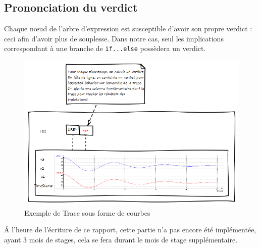 	\subsection{Prononciation du verdict}
	Chaque n\oe{}ud de l'arbre d'expression est susceptible d'avoir son propre verdict : ceci afin d'avoir plus de souplesse. Dans notre cas, seul les implications correspondant à une branche de \texttt{if...else} possèdera un verdict.
\vfill~\vfill

	\begin{figure}[H]
		\centering
		\includegraphics[width=16cm]{contents/images/trace.png}
		\caption{Exemple de Trace sous forme de courbes}
	\end{figure}

	\begin{remarque}
	\'A l'heure de l'écriture de ce rapport, cette partie n'a pas encore été implémentée, ayant 3 mois de stages, cela se fera durant le mois de stage supplémentaire.
		\end{remarque}